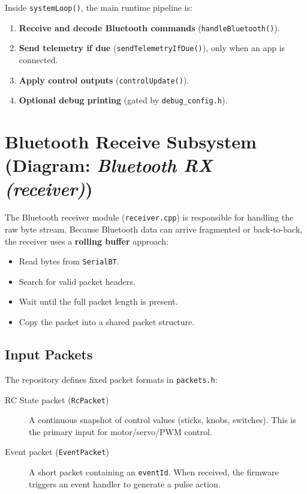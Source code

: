 Inside \texttt{systemLoop()}, the main runtime pipeline is:

\begin{enumerate}
    \item \textbf{Receive and decode Bluetooth commands} (\texttt{handleBluetooth()}).
    \item \textbf{Send telemetry if due} (\texttt{sendTelemetryIfDue()}), only when an app is connected.
    \item \textbf{Apply control outputs} (\texttt{controlUpdate()}).
    \item \textbf{Optional debug printing} (gated by \texttt{debug\_config.h}).
\end{enumerate}

\section{Bluetooth Receive Subsystem (Diagram: \textit{Bluetooth RX (receiver)})}

The Bluetooth receiver module (\texttt{receiver.cpp}) is responsible for handling the raw byte stream.
Because Bluetooth data can arrive fragmented or back-to-back, the receiver uses a \textbf{rolling buffer} approach:

\begin{itemize}
    \item Read bytes from \texttt{SerialBT}.
    \item Search for valid packet headers.
    \item Wait until the full packet length is present.
    \item Copy the packet into a shared packet structure.
\end{itemize}

\subsection{Input Packets}
The repository defines fixed packet formats in \texttt{packets.h}:

\begin{description}
    \item[RC State packet (\texttt{RcPacket})] A continuous snapshot of control values (sticks, knobs, switches).
    This is the primary input for motor/servo/PWM control.
    \item[Event packet (\texttt{EventPacket})] A short packet containing an \texttt{eventId}.
    When received, the firmware triggers an event handler to generate a pulse action.
\end{description}

